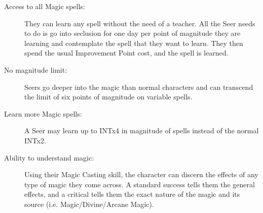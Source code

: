 \begin{description}
\item[Access to all Magic spells:] They can learn any spell without the need of a teacher. All the Seer needs to do is go into seclusion for one day per point of magnitude they are learning and contemplate the spell that they want to learn. They then spend the usual Improvement Point cost, and the spell is learned.

\item[No magnitude limit:] Seers go deeper into the magic than normal characters and can transcend the limit of six points of magnitude on variable spells.

\item[Learn more Magic spells:] A Seer may learn up to INTx4 in magnitude of spells instead of the normal INTx2.

\item[Ability to understand magic:] Using their Magic Casting skill, the character can discern the effects of any type of magic they come across. A standard success tells them the general effects, and a critical tells them the exact nature of the magic and its source (i.e. Magic/Divine/Arcane Magic).


\end{description}
